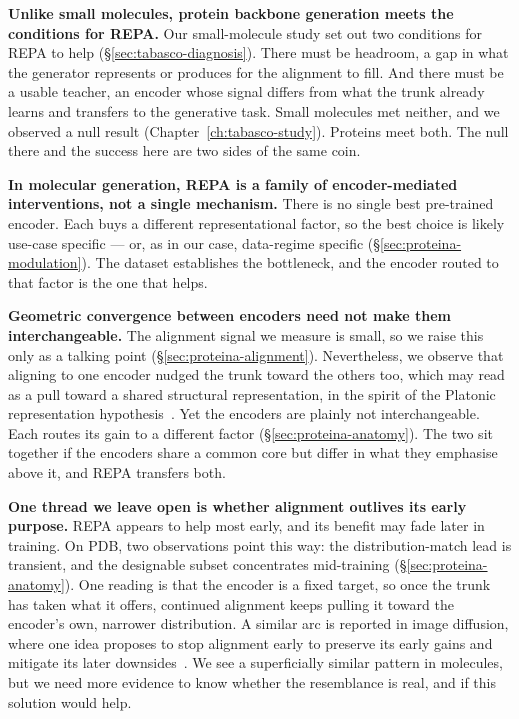 \documentclass[12pt,a4paper,twoside]{report}
\begin{document}
\textbf{Unlike small molecules, protein backbone generation meets the conditions for REPA.} Our small-molecule study set out two conditions for REPA to help (\S\ref{sec:tabasco-diagnosis}). There must be headroom, a gap in what the generator represents or produces for the alignment to fill. And there must be a usable teacher, an encoder whose signal differs from what the trunk already learns and transfers to the generative task. Small molecules met neither, and we observed a null result (Chapter~\ref{ch:tabasco-study}). Proteins meet both. The null there and the success here are two sides of the same coin.

\textbf{In molecular generation, REPA is a family of encoder-mediated interventions, not a single mechanism.} There is no single best pre-trained encoder. Each buys a different representational factor, so the best choice is likely use-case specific --- or, as in our case, data-regime specific (\S\ref{sec:proteina-modulation}). The dataset establishes the bottleneck, and the encoder routed to that factor is the one that helps.

\textbf{Geometric convergence between encoders need not make them interchangeable.} The alignment signal we measure is small, so we raise this only as a talking point (\S\ref{sec:proteina-alignment}). Nevertheless, we observe that aligning to one encoder nudged the trunk toward the others too, which may read as a pull toward a shared structural representation, in the spirit of the Platonic representation hypothesis~\cite{PlatonicRep}. Yet the encoders are plainly not interchangeable. Each routes its gain to a different factor (\S\ref{sec:proteina-anatomy}). The two sit together if the encoders share a common core but differ in what they emphasise above it, and REPA transfers both.

\textbf{One thread we leave open is whether alignment outlives its early purpose.} REPA appears to help most early, and its benefit may fade later in training. On PDB, two observations point this way: the distribution-match lead is transient, and the designable subset concentrates mid-training (\S\ref{sec:proteina-anatomy}). One reading is that the encoder is a fixed target, so once the trunk has taken what it offers, continued alignment keeps pulling it toward the encoder's own, narrower distribution. A similar arc is reported in image diffusion, where one idea proposes to stop alignment early to preserve its early gains and mitigate its later downsides~\cite{HASTE}. We see a superficially similar pattern in molecules, but we need more evidence to know whether the resemblance is real, and if this solution would help.
\end{document}
